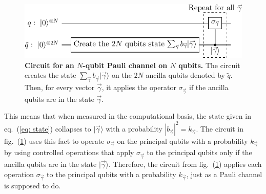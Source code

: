 \documentclass[10pt,letterpaper]{article} %
\begin{document}
\begin{figure}[h!]
\centering
\includegraphics{images/circuito_general.pdf}
\caption{ {\bf Circuit for an $N$-qubit Pauli channel on $N$ qubits.}
The circuit creates the state $\sum_{\vec{\gamma}} b_{\vec{\gamma}}|\vec{\gamma}\rangle$ 
on the $2N$ ancilla qubits denoted by $\tilde{q}$. 
Then, for every vector $\vec{\gamma}$, it applies the operator $\sigma_{\vec{\gamma}}$ 
if the ancilla qubits are in the state $\vec{\gamma}$.}
\label{fig: circuit-pauli}
\end{figure}

This means that when measured in the computational basis, the state given in eq.~(\ref{eq: state})
collapses to $|\vec{\gamma}\rangle$ with a 
probability $|b_{\vec{\gamma}}|^2 = k_{\vec\gamma}$. 
The circuit in fig.~(\ref{fig: circuit-pauli}) uses this fact
to operate $\sigma_{\vec{\gamma}}$ on the principal qubits
with a probability $k_{\vec\gamma}$ by using controlled operations 
that apply $\sigma_{\vec{\gamma}}$ to the principal qubits
only if the ancilla qubits are in the state $|\vec{\gamma}\rangle$.
Therefore, the circuit from fig.~(\ref{fig: circuit-pauli}) 
applies each operation $\sigma_{\vec{\gamma}}$ to the principal qubits 
with a probability $k_{\vec{\gamma}}$, 
just as a Pauli channel is supposed to do.  
\end{document}
